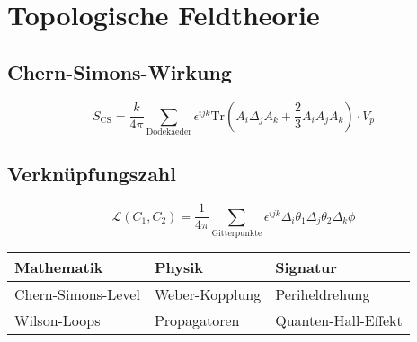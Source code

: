 \section{Topologische Feldtheorie}

\subsection{Chern-Simons-Wirkung}
\[
S_{\text{CS}} = \frac{k}{4\pi} \sum_{\text{Dodekaeder}} \epsilon^{ijk} \text{Tr}\left(
A_i \Delta_j A_k + \frac{2}{3} A_i A_j A_k
\right) \cdot V_p
\]

\subsection{Verknüpfungszahl}
\[
\mathcal{L}(C_1,C_2) = \frac{1}{4\pi} \sum_{\text{Gitterpunkte}} \epsilon^{ijk} \Delta_i \theta_1 \Delta_j \theta_2 \Delta_k \phi
\]

\begin{table}[h]
\centering
\begin{tabular}{|l|l|l|}
\hline
\textbf{Mathematik} & \textbf{Physik} & \textbf{Signatur} \\ \hline
Chern-Simons-Level & Weber-Kopplung & Periheldrehung \\ \hline
Wilson-Loops & Propagatoren & Quanten-Hall-Effekt \\ \hline
\end{tabular}
\end{table}